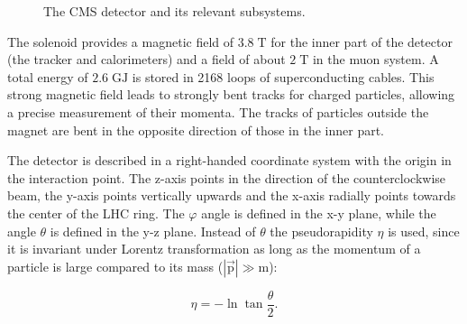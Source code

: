 \begin{figure}[htbp!]
  \begin{center}

\caption{The CMS detector and its relevant subsystems. \cite{Collaboration:1433717}
  \label{fig:det_CMS}}
  \end{center}
\end{figure}


The solenoid provides a magnetic field of $3.8 \;\si{\tesla}$ for the inner part of the detector (the tracker and calorimeters) and a field of about $2 \;\si{\tesla}$ in the muon system.
A total energy of $2.6 \;\si{\giga \joule}$ is stored in 2168 loops of superconducting cables.
This strong magnetic field leads to strongly bent tracks for charged particles, allowing a precise measurement of their momenta. 
The tracks of particles outside the magnet are bent in the opposite direction of those in the inner part.

The detector is described in a right-handed coordinate system with the origin in the interaction point.
The z-axis points in the direction of the counterclockwise beam, the y-axis points vertically upwards and the x-axis radially points towards the center of the LHC ring.
The $\varphi$ angle is defined in the x-y plane, while the angle $\theta$ is defined in the y-z plane. Instead of $\theta$ the pseudorapidity $\eta$ is used, since it is invariant under Lorentz transformation as long
as the momentum of a particle is large compared to its mass ($|\vec{\mathrm{p}}|\gg \mathrm{m}$):

\begin{equation}
\eta = -\ln{\tan{\frac{\theta}{2}}}.
\end{equation}

